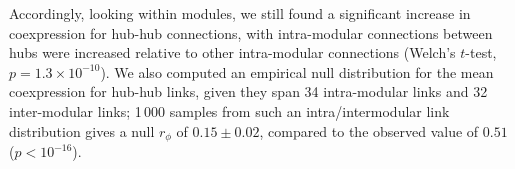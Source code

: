 \documentclass[10pt,letterpaper]{article}
\begin{document}
Accordingly, looking within modules, we still found a significant increase in coexpression for hub-hub connections, with intra-modular connections between hubs were increased relative to other intra-modular connections (Welch's $t$-test, $p = 1.3\times 10^{-10}$).
We also computed an empirical null distribution for the mean coexpression for hub-hub links, given they span 34 intra-modular links and 32 inter-modular links; 1\,000 samples from such an intra/intermodular link distribution gives a null $r_\phi$ of $0.15 \pm 0.02$, compared to the observed value of $0.51$ ($p < 10^{-16}$).

\end{document}
